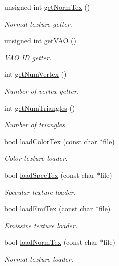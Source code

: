 \begin{DoxyCompactItemize}
unsigned int \hyperlink{class_mesh_a8b60518f329c4e3d15824ef68c794fa1}{get\+Norm\+Tex} ()
\begin{DoxyCompactList}\small\item\em Normal texture getter. \end{DoxyCompactList}\item 
unsigned int \hyperlink{class_mesh_add2e2bafe60711ec9f67308c140640a9}{get\+V\+AO} ()
\begin{DoxyCompactList}\small\item\em V\+AO ID getter. \end{DoxyCompactList}\item 
int \hyperlink{class_mesh_ae4163571bceed9d224fc43e943dda118}{get\+Num\+Vertex} ()
\begin{DoxyCompactList}\small\item\em Number of vertex getter. \end{DoxyCompactList}\item 
int \hyperlink{class_mesh_a4452aed4ac63ff0639b839bba095347e}{get\+Num\+Triangles} ()
\begin{DoxyCompactList}\small\item\em Number of triangles. \end{DoxyCompactList}\item 
bool \hyperlink{class_mesh_ac06b928f547c1eec3b66ae5503608c21}{load\+Color\+Tex} (const char $\ast$file)
\begin{DoxyCompactList}\small\item\em Color texture loader. \end{DoxyCompactList}\item 
bool \hyperlink{class_mesh_ada437d0826057661de46ab5ce2b497a4}{load\+Spec\+Tex} (const char $\ast$file)
\begin{DoxyCompactList}\small\item\em Specular texture loader. \end{DoxyCompactList}\item 
bool \hyperlink{class_mesh_abb21ce55711b89f7018d103b50294f69}{load\+Emi\+Tex} (const char $\ast$file)
\begin{DoxyCompactList}\small\item\em Emissive texture loader. \end{DoxyCompactList}\item 
bool \hyperlink{class_mesh_a443b1a0a0c36ff911f58f2a5f4616538}{load\+Norm\+Tex} (const char $\ast$file)
\begin{DoxyCompactList}\small\item\em Normal texture loader. \end{DoxyCompactList}\item 

\end{DoxyCompactItemize}
